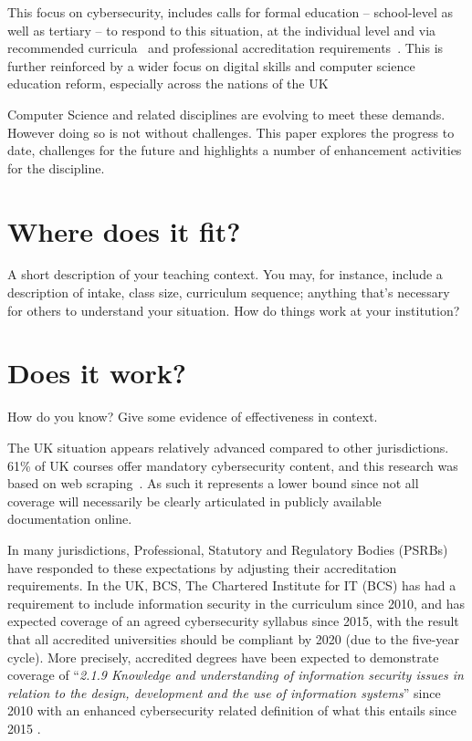 \documentclass[sigconf]{acmart}
\begin{document}
This focus on cybersecurity, includes calls for formal education -- school-level as well as tertiary -- to respond to this situation, at the individual level and via recommended curricula~\cite{mcgettrick-et-al:sigcse2014,ACM2017b} and professional accreditation requirements~\cite{BCS2018a,NCSC2017}. This is further reinforced by a wider focus on digital skills and computer science education reform, especially across the nations of the UK~\cite{brown-et-al:toce2014,murphy-et-al:programming2017,tryfonas+crick:petra2018}

Computer Science and related disciplines are evolving to meet these demands. However doing so is not without challenges. This paper explores the progress to date, challenges for the future and highlights a number of enhancement activities for the discipline.

\section {Where does it fit?	}A short description of your teaching context. You may, for instance, include a description of intake, class size, curriculum sequence; anything that's necessary for others to understand your situation. How do things work at your institution?

\section {Does it work?}	How do you know? Give some evidence of effectiveness in context.

The UK situation appears relatively advanced compared to other jurisdictions. 61\% of UK courses offer mandatory cybersecurity content, and this research was based on web scraping~\cite[Table 1]{Ruiz2019a}. As such it represents a lower bound since not all coverage will necessarily be clearly articulated in publicly available documentation online.

In many jurisdictions, Professional, Statutory and Regulatory Bodies (PSRBs) have responded to these expectations by adjusting their accreditation requirements. In the UK, BCS, The Chartered Institute for IT (BCS) has had a requirement to include information security in the curriculum since 2010, and has expected coverage of an agreed cybersecurity syllabus since 2015, with the result that all accredited universities should be compliant by 2020 (due to the five-year cycle). More precisely, accredited degrees have been expected to demonstrate coverage of ``{\emph{2.1.9 Knowledge and understanding of information security issues in relation to the design, development and the use of information systems}}'' \cite[p.~30]{BCS2018a} since 2010 with an enhanced cybersecurity related definition of what this entails since 2015 \cite[p.~17--18]{BCS2018a}.
\end{document}
